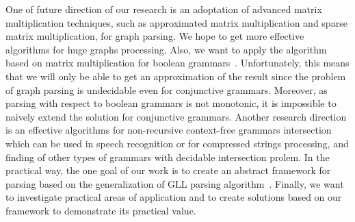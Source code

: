 \documentclass{vldb}
\begin{document}
One of future direction of our research is an adoptation of advanced matrix multiplication techniques, such as approximated matrix multiplication and sparse matrix multiplication, for graph parsing.
We hope to get more effective algorithms for huge graphs processing.
Also, we want to apply the algorithm based on matrix multiplication for boolean grammars~\cite{Okhotin}. 
Unfortunately, this means that we will only be able to get an approximation of the result since the problem of graph parsing is undecidable even for conjunctive grammars. 
Moreover, as parsing with respect to boolean grammars is not monotonic, it is impossible to naively extend the solution for conjunctive grammars. 
Another research direction is an effective algorithms for non-recursive context-free grammars intersection~\cite{Nederhof1, Nederhof2} which can be used in speech recognition or for compressed strings processing, and finding of other types of grammars with decidable intersection prolem. 
In the practical way, the one goal of our work is to create an abstract framework for parsing based on the generalization of GLL parsing algorithm~\cite{GLL}. 
Finally, we want to investigate practical areas of application and to create solutions based on our framework to demonstrate its practical value.
\end{document}
